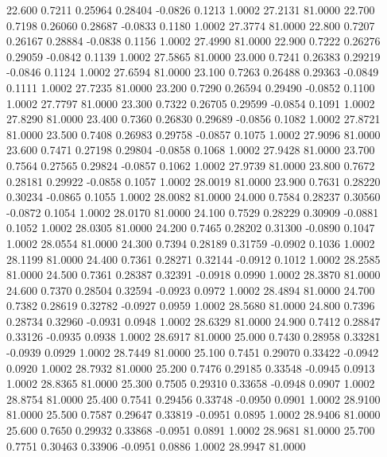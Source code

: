   22.600   0.7211   0.25964   0.28404  -0.0826   0.1213   1.0002  27.2131  81.0000
  22.700   0.7198   0.26060   0.28687  -0.0833   0.1180   1.0002  27.3774  81.0000
  22.800   0.7207   0.26167   0.28884  -0.0838   0.1156   1.0002  27.4990  81.0000
  22.900   0.7222   0.26276   0.29059  -0.0842   0.1139   1.0002  27.5865  81.0000
  23.000   0.7241   0.26383   0.29219  -0.0846   0.1124   1.0002  27.6594  81.0000
  23.100   0.7263   0.26488   0.29363  -0.0849   0.1111   1.0002  27.7235  81.0000
  23.200   0.7290   0.26594   0.29490  -0.0852   0.1100   1.0002  27.7797  81.0000
  23.300   0.7322   0.26705   0.29599  -0.0854   0.1091   1.0002  27.8290  81.0000
  23.400   0.7360   0.26830   0.29689  -0.0856   0.1082   1.0002  27.8721  81.0000
  23.500   0.7408   0.26983   0.29758  -0.0857   0.1075   1.0002  27.9096  81.0000
  23.600   0.7471   0.27198   0.29804  -0.0858   0.1068   1.0002  27.9428  81.0000
  23.700   0.7564   0.27565   0.29824  -0.0857   0.1062   1.0002  27.9739  81.0000
  23.800   0.7672   0.28181   0.29922  -0.0858   0.1057   1.0002  28.0019  81.0000
  23.900   0.7631   0.28220   0.30234  -0.0865   0.1055   1.0002  28.0082  81.0000
  24.000   0.7584   0.28237   0.30560  -0.0872   0.1054   1.0002  28.0170  81.0000
  24.100   0.7529   0.28229   0.30909  -0.0881   0.1052   1.0002  28.0305  81.0000
  24.200   0.7465   0.28202   0.31300  -0.0890   0.1047   1.0002  28.0554  81.0000
  24.300   0.7394   0.28189   0.31759  -0.0902   0.1036   1.0002  28.1199  81.0000
  24.400   0.7361   0.28271   0.32144  -0.0912   0.1012   1.0002  28.2585  81.0000
  24.500   0.7361   0.28387   0.32391  -0.0918   0.0990   1.0002  28.3870  81.0000
  24.600   0.7370   0.28504   0.32594  -0.0923   0.0972   1.0002  28.4894  81.0000
  24.700   0.7382   0.28619   0.32782  -0.0927   0.0959   1.0002  28.5680  81.0000
  24.800   0.7396   0.28734   0.32960  -0.0931   0.0948   1.0002  28.6329  81.0000
  24.900   0.7412   0.28847   0.33126  -0.0935   0.0938   1.0002  28.6917  81.0000
  25.000   0.7430   0.28958   0.33281  -0.0939   0.0929   1.0002  28.7449  81.0000
  25.100   0.7451   0.29070   0.33422  -0.0942   0.0920   1.0002  28.7932  81.0000
  25.200   0.7476   0.29185   0.33548  -0.0945   0.0913   1.0002  28.8365  81.0000
  25.300   0.7505   0.29310   0.33658  -0.0948   0.0907   1.0002  28.8754  81.0000
  25.400   0.7541   0.29456   0.33748  -0.0950   0.0901   1.0002  28.9100  81.0000
  25.500   0.7587   0.29647   0.33819  -0.0951   0.0895   1.0002  28.9406  81.0000
  25.600   0.7650   0.29932   0.33868  -0.0951   0.0891   1.0002  28.9681  81.0000
  25.700   0.7751   0.30463   0.33906  -0.0951   0.0886   1.0002  28.9947  81.0000
